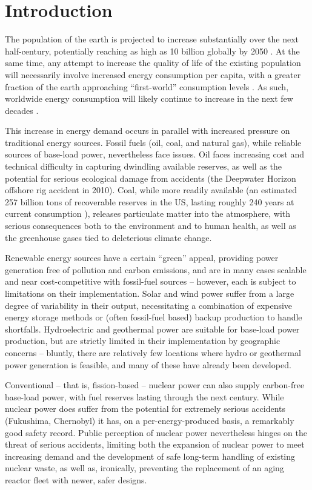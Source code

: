 \chapter{Introduction}\label{ch:Introduction}

The population of the earth is projected to increase substantially over the next half-century, potentially reaching as high as 10 billion globally by 2050 \cite{World2010}.  At the same time, any attempt to increase the quality of life of the existing population will necessarily involve increased energy consumption per capita, with a greater fraction of the earth approaching ``first-world'' consumption levels \cite{HDI2011}.  As such, worldwide energy consumption will likely continue to increase in the next few decades \cite{EIA2011,BP2010}.

This increase in energy demand occurs in parallel with increased pressure on traditional energy sources.  Fossil fuels (oil, coal, and natural gas), while reliable sources of base-load power, nevertheless face issues.  Oil faces increasing cost and technical difficulty in capturing dwindling available reserves, as well as the potential for serious ecological damage from accidents (\eg the Deepwater Horizon offshore rig accident in 2010).  Coal, while more readily available (an estimated 257 billion tons of recoverable reserves in the US, lasting roughly 240 years at current consumption \cite{BP2010,EIA2013}), releases particulate matter into the atmosphere, with serious consequences both to the environment and to human health, as well as the greenhouse gases tied to deleterious climate change.  

Renewable energy sources have a certain ``green'' appeal, providing power generation free of pollution and carbon emissions, and are in many cases scalable and near cost-competitive with fossil-fuel sources -- however, each is subject to limitations on their implementation.  Solar and wind power suffer from a large degree of variability in their output, necessitating a combination of expensive energy storage methods or (often fossil-fuel based) backup production to handle shortfalls.  Hydroelectric and geothermal power are suitable for base-load power production, but are strictly limited in their implementation by geographic concerns -- bluntly, there are relatively few locations where hydro or geothermal power generation is feasible, and many of these have already been developed.

Conventional -- that is, fission-based -- nuclear power can also supply carbon-free base-load power, with fuel reserves lasting through the next century.  While nuclear power does  suffer from the potential for extremely serious accidents (Fukushima, Chernobyl) it has, on a per-energy-produced basis, a remarkably good safety record.  Public perception of nuclear power nevertheless hinges on the threat of serious accidents, limiting both the expansion of nuclear power to meet increasing demand and the development of safe long-term handling of existing nuclear waste, as well as, ironically, preventing the replacement of an aging reactor fleet with newer, safer designs.

